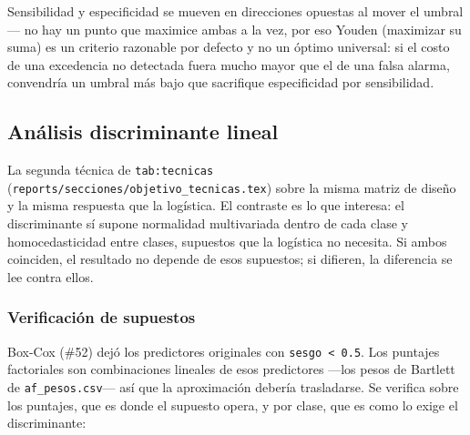\documentclass[
  spanish,
  letterpaper,
  DIV=11,
  numbers=noendperiod]{scrartcl}
\begin{document}
Sensibilidad y especificidad se mueven en direcciones opuestas al mover
el umbral --- no hay un punto que maximice ambas a la vez, por eso
Youden (maximizar su suma) es un criterio razonable por defecto y no un
óptimo universal: si el costo de una excedencia no detectada fuera mucho
mayor que el de una falsa alarma, convendría un umbral más bajo que
sacrifique especificidad por sensibilidad.

\subsection{Análisis discriminante
lineal}\label{anuxe1lisis-discriminante-lineal}

La segunda técnica de \texttt{tab:tecnicas}
(\texttt{reports/secciones/objetivo\_tecnicas.tex}) sobre la misma
matriz de diseño y la misma respuesta que la logística. El contraste es
lo que interesa: el discriminante sí supone normalidad multivariada
dentro de cada clase y homocedasticidad entre clases, supuestos que la
logística no necesita. Si ambos coinciden, el resultado no depende de
esos supuestos; si difieren, la diferencia se lee contra ellos.

\subsubsection{Verificación de
supuestos}\label{verificaciuxf3n-de-supuestos}

Box-Cox (\#52) dejó los predictores originales con
\texttt{\textbar{}sesgo\textbar{}\ \textless{}\ 0.5}. Los puntajes
factoriales son combinaciones lineales de esos predictores ---los pesos
de Bartlett de \texttt{af\_pesos.csv}--- así que la aproximación debería
trasladarse. Se verifica sobre los puntajes, que es donde el supuesto
opera, y por clase, que es como lo exige el discriminante:
\end{document}
